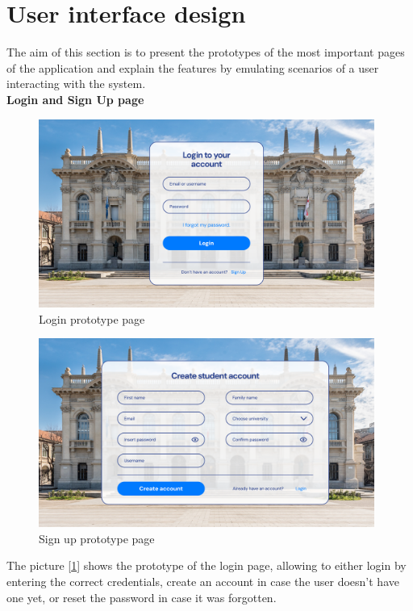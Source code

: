 \documentclass[11pt,twoside]{article}
\begin{document}
\section{User interface design}
The aim of this section is to present the prototypes of the most important pages of the application and explain the features by emulating scenarios of a user interacting with the system.
\vspace{1\baselineskip} \\
\large{\textbf{Login and Sign Up page}}
\begin{figure}[H]
\centering
\includegraphics[width=0.98\textwidth]{Images/Login}
\caption{Login prototype page}\label{Login}
\end{figure}
\begin{figure}[H]
\centering
\includegraphics[width=0.98\textwidth]{Images/Sign Up}
\caption{Sign up prototype page}\label{Sign Up}
\end{figure}
\newpage
The picture [\ref{Login}] shows the prototype of the login page, allowing to either login by entering the correct credentials, create an account in case the user doesn't have one yet, or reset the password in case it was forgotten.\\
\end{document}
